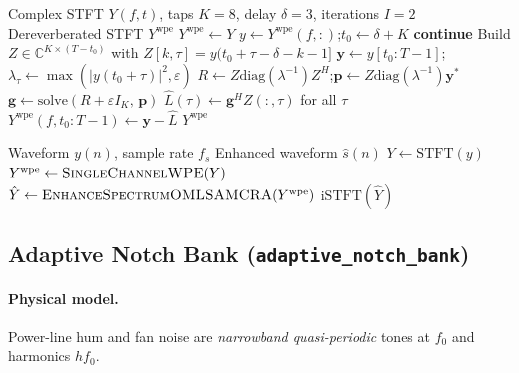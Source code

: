 \begin{algorithm}[H]
  \caption{Single-channel WPE in STFT domain (\texttt{single\_channel\_wpe})}
  \label{alg:wpe}
  \begin{algorithmic}[1]
    \Require Complex STFT $Y(f,t)$, taps $K=8$, delay $\delta=3$, iterations $I=2$
    \Ensure Dereverberated STFT $Y^{\mathrm{wpe}}$
    \State $Y^{\mathrm{wpe}} \gets Y$
        \State $y \gets Y^{\mathrm{wpe}}(f,:)$;\quad $t_0 \gets \delta + K$
         \textbf{continue} \EndIf
        \State Build $Z\in\mathbb{C}^{K\times(T-t_0)}$ with $Z[k,\tau]=y(t_0+\tau-\delta-k-1]$
        \State $\mathbf{y} \gets y[t_0:T-1]$;\quad $\lambda_\tau \gets \max(|y(t_0+\tau)|^2,\varepsilon)$
        \State $R \gets Z \mathrm{diag}(\lambda^{-1}) Z^H$;\quad $\mathbf{p} \gets Z \mathrm{diag}(\lambda^{-1}) \mathbf{y}^*$
        \State $\mathbf{g} \gets \mathrm{solve}(R + \varepsilon I_K,\, \mathbf{p})$ 
        \State $\hat{L}(\tau) \gets \mathbf{g}^H Z(:,\tau)$ for all $\tau$
        \State $Y^{\mathrm{wpe}}(f,t_0:T-1) \gets \mathbf{y} - \hat{L}$
      \EndFor
    \EndFor
    \State \Return $Y^{\mathrm{wpe}}$
  \end{algorithmic}
\end{algorithm}

\begin{algorithm}[H]
  \caption{WPE + OM-LSA pipeline (\texttt{wpe\_omlsa.process})}
  \label{alg:wpe_omlsa}
  \begin{algorithmic}[1]
    \Require Waveform $y(n)$, sample rate $f_s$
    \Ensure Enhanced waveform $\hat{s}(n)$
    \State $Y \gets \mathrm{STFT}(y)$
    \State $Y^{\mathrm{wpe}} \gets \textsc{SingleChannelWPE}(Y)$
    \State $\hat{Y} \gets \textsc{EnhanceSpectrumOMLSAMCRA}(Y^{\mathrm{wpe}})$
    \State \Return $\mathrm{iSTFT}(\hat{Y})$
  \end{algorithmic}
\end{algorithm}

\subsection{Adaptive Notch Bank (\texttt{adaptive\_notch\_bank})}

\paragraph{Physical model.}
Power-line hum and fan noise are \emph{narrowband quasi-periodic} tones at $f_0$ and harmonics $hf_0$.

